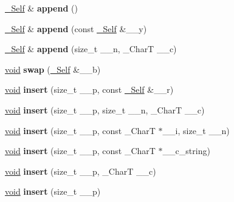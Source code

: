 \begin{DoxyCompactItemize}
\hyperlink{classrope}{\+\_\+\+Self} \& {\bfseries append} ()
\item 
\mbox{\label{classrope_a978e5e54009c4860b3e5cb188231b6c7}} 
\hyperlink{classrope}{\+\_\+\+Self} \& {\bfseries append} (const \hyperlink{classrope}{\+\_\+\+Self} \&\+\_\+\+\_\+y)
\item 
\mbox{\label{classrope_ad0f2ab7cbbe34c9d5d86ff046862a5cc}} 
\hyperlink{classrope}{\+\_\+\+Self} \& {\bfseries append} (size\+\_\+t \+\_\+\+\_\+n, \+\_\+\+CharT \+\_\+\+\_\+c)
\item 
\mbox{\label{classrope_a1ee36722f0984835a5a084acb25aac29}} 
\hyperlink{interfacevoid}{void} {\bfseries swap} (\hyperlink{classrope}{\+\_\+\+Self} \&\+\_\+\+\_\+b)
\item 
\mbox{\label{classrope_ac66c6cfeea5fb4ad318d267aee8abef0}} 
\hyperlink{interfacevoid}{void} {\bfseries insert} (size\+\_\+t \+\_\+\+\_\+p, const \hyperlink{classrope}{\+\_\+\+Self} \&\+\_\+\+\_\+r)
\item 
\mbox{\label{classrope_a85319947ca8196684bf49ba899af4fef}} 
\hyperlink{interfacevoid}{void} {\bfseries insert} (size\+\_\+t \+\_\+\+\_\+p, size\+\_\+t \+\_\+\+\_\+n, \+\_\+\+CharT \+\_\+\+\_\+c)
\item 
\mbox{\label{classrope_ac8e5ac9ee36f1da19da2b4ea577ecb95}} 
\hyperlink{interfacevoid}{void} {\bfseries insert} (size\+\_\+t \+\_\+\+\_\+p, const \+\_\+\+CharT $\ast$\+\_\+\+\_\+i, size\+\_\+t \+\_\+\+\_\+n)
\item 
\mbox{\label{classrope_a08665b9ee1f17435f056cdc49cd09cd8}} 
\hyperlink{interfacevoid}{void} {\bfseries insert} (size\+\_\+t \+\_\+\+\_\+p, const \+\_\+\+CharT $\ast$\+\_\+\+\_\+c\+\_\+string)
\item 
\mbox{\label{classrope_a9067c1713073575a823417a5afc74f1b}} 
\hyperlink{interfacevoid}{void} {\bfseries insert} (size\+\_\+t \+\_\+\+\_\+p, \+\_\+\+CharT \+\_\+\+\_\+c)
\item 
\mbox{\label{classrope_aeeae7d02cf0347c0a0349769a711c0fd}} 
\hyperlink{interfacevoid}{void} {\bfseries insert} (size\+\_\+t \+\_\+\+\_\+p)

\end{DoxyCompactItemize}
